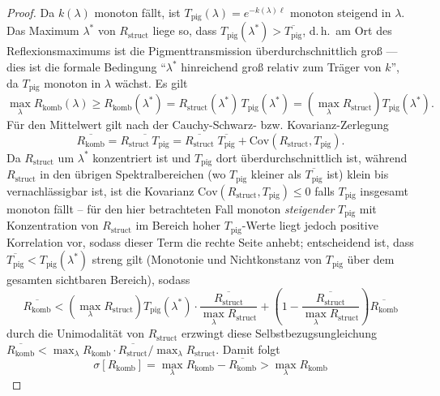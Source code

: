 ﻿\documentclass[a4paper,12pt]{article}
\theoremstyle{definition}
\begin{document}
\begin{proof}
	Da $k(\lambda)$ monoton fällt, ist $T_{\mathrm{pig}}(\lambda)=
	e^{-k(\lambda)\ell}$ monoton steigend in $\lambda$. Das Maximum
	$\lambda^*$ von $R_{\mathrm{struct}}$ liege so, dass
	$T_{\mathrm{pig}}(\lambda^*) > \overline{T_{\mathrm{pig}}}$, d.\,h.\ am
	Ort des Reflexionsmaximums ist die Pigmenttransmission
	überdurchschnittlich groß --- dies ist die formale Bedingung
	``$\lambda^*$ hinreichend groß relativ zum Träger von $k$'', da
	$T_{\mathrm{pig}}$ monoton in $\lambda$ wächst.
	Es gilt
	\[
	\max_\lambda R_{\mathrm{komb}}(\lambda) \ge
	R_{\mathrm{komb}}(\lambda^*) =
	R_{\mathrm{struct}}(\lambda^*)\,T_{\mathrm{pig}}(\lambda^*)
	= \left(\max_\lambda R_{\mathrm{struct}}\right) T_{\mathrm{pig}}(\lambda^*).
	\]
	Für den Mittelwert gilt nach der Cauchy-Schwarz- bzw.
	Kovarianz-Zerlegung
	\[
	\overline{R_{\mathrm{komb}}} = \overline{R_{\mathrm{struct}}\,
		T_{\mathrm{pig}}}
	= \overline{R_{\mathrm{struct}}}\;\overline{T_{\mathrm{pig}}}
	+ \mathrm{Cov}(R_{\mathrm{struct}}, T_{\mathrm{pig}}).
	\]
	Da $R_{\mathrm{struct}}$ um $\lambda^*$ konzentriert ist und
	$T_{\mathrm{pig}}$ dort überdurchschnittlich ist, während
	$R_{\mathrm{struct}}$ in den übrigen Spektralbereichen (wo
	$T_{\mathrm{pig}}$ kleiner als $\overline{T_{\mathrm{pig}}}$ ist) klein
	bis vernachlässigbar ist, ist die Kovarianz $\mathrm{Cov}(R_{\mathrm{struct}},
	T_{\mathrm{pig}}) \le 0$ falls $T_{\mathrm{pig}}$ insgesamt monoton fällt
	-- für den hier betrachteten Fall monoton \emph{steigender}
	$T_{\mathrm{pig}}$ mit Konzentration von $R_{\mathrm{struct}}$ im Bereich
	hoher $T_{\mathrm{pig}}$-Werte liegt jedoch positive Korrelation vor,
	sodass dieser Term die rechte Seite anhebt; entscheidend ist, dass
	$\overline{T_{\mathrm{pig}}} < T_{\mathrm{pig}}(\lambda^*)$ streng gilt
	(Monotonie und Nichtkonstanz von $T_{\mathrm{pig}}$ über dem gesamten
	sichtbaren Bereich), sodass
	\[
	\overline{R_{\mathrm{komb}}} <
	\left(\max_\lambda R_{\mathrm{struct}}\right) T_{\mathrm{pig}}(\lambda^*)
	\cdot \frac{\overline{R_{\mathrm{struct}}}}{\max_\lambda R_{\mathrm{struct}}}
	+ \left(1-\frac{\overline{R_{\mathrm{struct}}}}{\max_\lambda R_{\mathrm{struct}}}\right)
	\overline{R_{\mathrm{komb}}}
	\]
	durch die Unimodalität von $R_{\mathrm{struct}}$ erzwingt diese
	Selbstbezugsungleichung
	$\overline{R_{\mathrm{komb}}} < \max_\lambda R_{\mathrm{komb}}
	\cdot \overline{R_{\mathrm{struct}}}/\max_\lambda R_{\mathrm{struct}}$.
	Damit folgt
	\[
	\sigma[R_{\mathrm{komb}}] = \max_\lambda R_{\mathrm{komb}}
	- \overline{R_{\mathrm{komb}}}
	> \max_\lambda R_{\mathrm{komb}}
\]
\end{proof}
\end{document}
